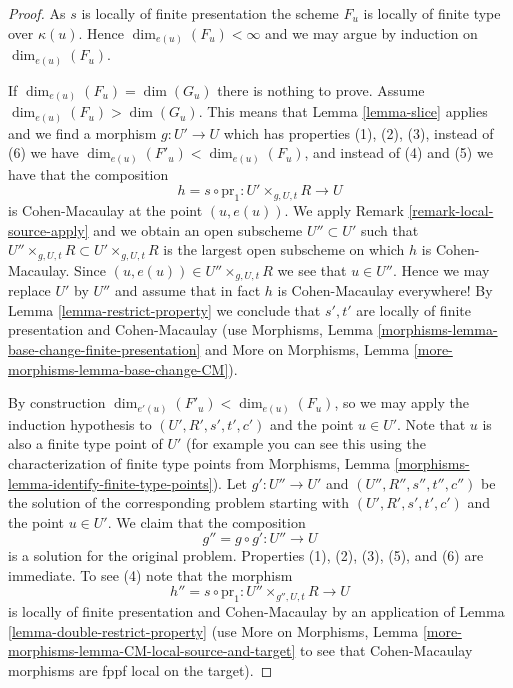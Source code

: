 \documentclass{stacks-project}
\theoremstyle{plain}
\theoremstyle{definition}
\theoremstyle{remark}
\numberwithin{equation}{subsection}
\begin{document}
\begin{proof}
As $s$ is locally of finite presentation the scheme $F_u$ is
locally of finite type over $\kappa(u)$. Hence
$\dim_{e(u)}(F_u) < \infty$ and we may argue by induction on
$\dim_{e(u)}(F_u)$.

\medskip\noindent
If $\dim_{e(u)}(F_u) = \dim(G_u)$ there is nothing to prove.
Assume $\dim_{e(u)}(F_u) > \dim(G_u)$. This means that
Lemma \ref{lemma-slice}
applies and we find a morphism $g : U' \to U$ which has
properties (1), (2), (3), instead of (6) we have
$\dim_{e(u)}(F'_u) < \dim_{e(u)}(F_u)$,
and instead of (4) and (5) we have that the composition
$$
h = s \circ \text{pr}_1 : U' \times_{g, U, t} R \longrightarrow U
$$
is Cohen-Macaulay at the point $(u, e(u))$. We apply
Remark \ref{remark-local-source-apply}
and we obtain an open subscheme $U'' \subset U'$ such that
$U'' \times_{g, U, t} R \subset U' \times_{g, U, t} R$
is the largest open subscheme on which $h$ is Cohen-Macaulay.
Since $(u, e(u)) \in U'' \times_{g, U, t} R$ we see that $u \in U''$.
Hence we may replace $U'$ by $U''$ and assume that in fact $h$ is
Cohen-Macaulay everywhere! By
Lemma \ref{lemma-restrict-property}
we conclude that $s', t'$ are locally of finite
presentation and Cohen-Macaulay (use
Morphisms, Lemma \ref{morphisms-lemma-base-change-finite-presentation}
and
More on Morphisms, Lemma \ref{more-morphisms-lemma-base-change-CM}).

\medskip\noindent
By construction $\dim_{e'(u)}(F'_u) < \dim_{e(u)}(F_u)$,
so we may apply the induction hypothesis to $(U', R', s', t', c')$
and the point $u \in U'$. Note that $u$ is also a finite type point
of $U'$ (for example you can see this using the characterization of
finite type points from
Morphisms, Lemma \ref{morphisms-lemma-identify-finite-type-points}).
Let $g' : U'' \to U'$ and $(U'', R'', s'', t'', c'')$ be the solution
of the corresponding problem starting with $(U', R', s', t', c')$
and the point $u \in U'$. We claim that the composition
$$
g'' = g \circ g' : U'' \longrightarrow U
$$
is a solution for the original problem. Properties (1), (2), (3), (5),
and (6) are immediate. To see (4) note that the morphism
$$
h'' = s \circ \text{pr}_1 : U'' \times_{g'', U, t} R \longrightarrow U
$$
is locally of finite presentation and Cohen-Macaulay by an application of
Lemma \ref{lemma-double-restrict-property}
(use
More on Morphisms, Lemma \ref{more-morphisms-lemma-CM-local-source-and-target}
to see that Cohen-Macaulay morphisms are fppf local on the target).
\end{proof}
\end{document}
